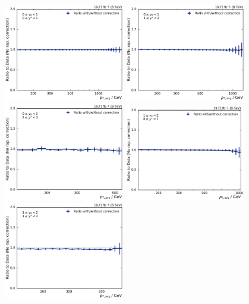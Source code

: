 \begin{figure}[htbp]
    \centering
    \includegraphics[width=0.47\textwidth]{figures/measurement/rap_corr_data_yb0ys0.pdf}\hfill
    \includegraphics[width=0.47\textwidth]{figures/measurement/rap_corr_data_yb0ys1.pdf}
    \includegraphics[width=0.47\textwidth]{figures/measurement/rap_corr_data_yb0ys2.pdf}\hfill
    \includegraphics[width=0.47\textwidth]{figures/measurement/rap_corr_data_yb1ys0.pdf}
    \includegraphics[width=0.47\textwidth]{figures/measurement/rap_corr_data_yb1ys1.pdf}\hfill

\end{figure}
